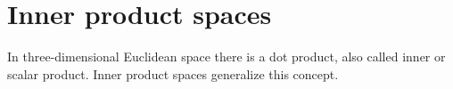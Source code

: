 %
%

\section{Inner product spaces}

In three-dimensional Euclidean space there is a dot product, also called
inner or scalar product. Inner product spaces generalize this concept.

